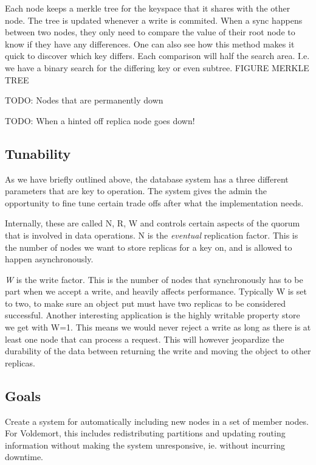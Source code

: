 Each node keeps a merkle tree for the keyspace that it shares with the other node. The tree is updated whenever a write is commited.
When a sync happens between two nodes, they only need to compare the value of their root node to know if they have any differences.
One can also see how this method makes it quick to discover which key differs. Each comparison will half the search area.
I.e. we have a binary search for the differing key or even subtree.
FIGURE MERKLE TREE

TODO: Nodes that are permanently down

TODO: When a hinted off replica node goes down!

\subsection{Tunability}
As we have briefly outlined above, the database system has a three different parameters that are key to operation.
The system gives the admin the opportunity to fine tune certain trade offs after what the implementation needs.

Internally, these are called N, R, W and controls certain aspects of the quorum that is involved in data operations. N is the \emph{eventual} replication factor.
This is the number of nodes we want to store replicas for a key on, and is allowed to happen asynchronously.

\emph{W} is the write factor. This is the number of nodes that synchronously has to be part when we accept a write, and heavily affects performance. 
Typically W is set to two, to make sure an object put must have two replicas to be considered successful. 
Another interesting application is the highly writable property store we get with W=1. This means we would never reject a write as long as there is at least one node that can process a request. This will however jeopardize the durability of the data between returning the write and moving the object to other replicas.


\subsection{Goals}
Create a system for automatically including new nodes in a set of member nodes.
For Voldemort, this includes redistributing partitions and updating routing information without making the system unresponsive, ie. without incurring downtime.


